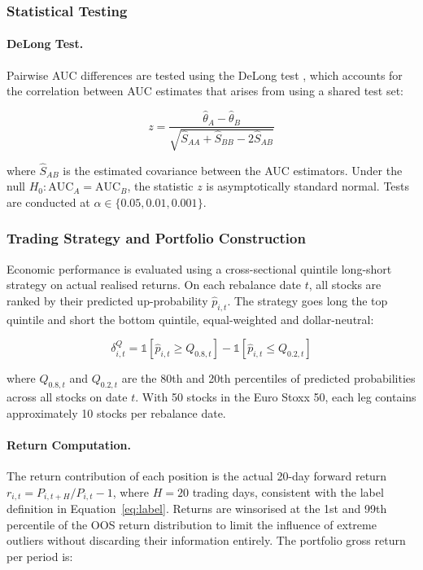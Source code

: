 \subsubsection{Statistical Testing}

\paragraph{DeLong Test.}
Pairwise AUC differences are tested using the DeLong test \parencite{delong1988}, which accounts for the correlation between AUC estimates that arises from using a shared test set:

\begin{equation}
z = \frac{\hat{\theta}_A - \hat{\theta}_B}{\sqrt{\hat{S}_{AA} + \hat{S}_{BB} - 2\hat{S}_{AB}}}
\label{eq:delong}
\end{equation}

where $\hat{S}_{AB}$ is the estimated covariance between the AUC estimators. Under the null $H_0: \text{AUC}_A = \text{AUC}_B$, the statistic $z$ is asymptotically standard normal. Tests are conducted at $\alpha \in \{0.05, 0.01, 0.001\}$.

\subsubsection{Trading Strategy and Portfolio Construction}

Economic performance is evaluated using a cross-sectional quintile long-short strategy on actual realised returns. On each rebalance date $t$, all stocks are ranked by their predicted up-probability $\hat{p}_{i,t}$. The strategy goes long the top quintile and short the bottom quintile, equal-weighted and dollar-neutral:

\begin{equation}
\delta^{Q}_{i,t} = \mathbb{1}\!\left[\hat{p}_{i,t} \geq Q_{0.8,t}\right] - \mathbb{1}\!\left[\hat{p}_{i,t} \leq Q_{0.2,t}\right]
\label{eq:quintile}
\end{equation}

where $Q_{0.8,t}$ and $Q_{0.2,t}$ are the 80th and 20th percentiles of predicted probabilities across all stocks on date $t$. With 50 stocks in the Euro Stoxx 50, each leg contains approximately 10 stocks per rebalance date.

\paragraph{Return Computation.}
The return contribution of each position is the actual 20-day forward return $r_{i,t} = P_{i,t+H}/P_{i,t} - 1$, where $H = 20$ trading days, consistent with the label definition in Equation~\eqref{eq:label}. Returns are winsorised at the 1st and 99th percentile of the OOS return distribution to limit the influence of extreme outliers without discarding their information entirely. The portfolio gross return per period is:

